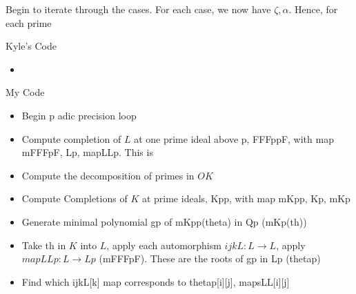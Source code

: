 \documentclass[11pt]{article}
\theoremstyle{definition}
\begin{document}
Begin to iterate through the cases. For each case, we now have $\zeta, \alpha$. Hence, for each prime

\begin{multicols}{2}
Kyle's Code
\begin{itemize}
\item 
\end{itemize}

\columnbreak 

My Code
\begin{itemize}
\item Begin p adic precision loop
\item Compute completion of $L$ at one prime ideal above p, FFFppF, with map mFFFpF, Lp, mapLLp. This is 
\item Compute the decomposition of primes in $OK$
\item Compute Completions of $K$ at prime ideals, Kpp, with map mKpp, Kp, mKp
\item Generate minimal polynomial gp of mKpp(theta) in Qp (mKp(th))
\end{itemize}
\begin{center}
\end{center}
\begin{itemize}
\item Take th in $K$ into $L$, apply each automorphism $ijkL: L \to L$, apply $mapLLp: L \to Lp$ (mFFFpF). These are the roots of gp in Lp (thetap)
\item Find which ijkL[k] map corresponds to thetap[i][j], mapsLL[i][j]
\end{itemize}
\end{multicols}
\end{document}
